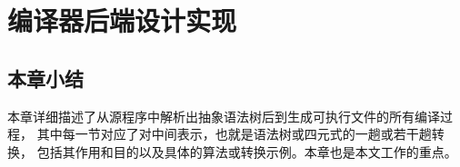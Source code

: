 
\chapter{编译器后端设计实现}























\section{本章小结}

本章详细描述了从源程序中解析出抽象语法树后到生成可执行文件的所有编译过程，
其中每一节对应了对中间表示，也就是语法树或四元式的一趟或若干趟转换，
包括其作用和目的以及具体的算法或转换示例。本章也是本文工作的重点。
